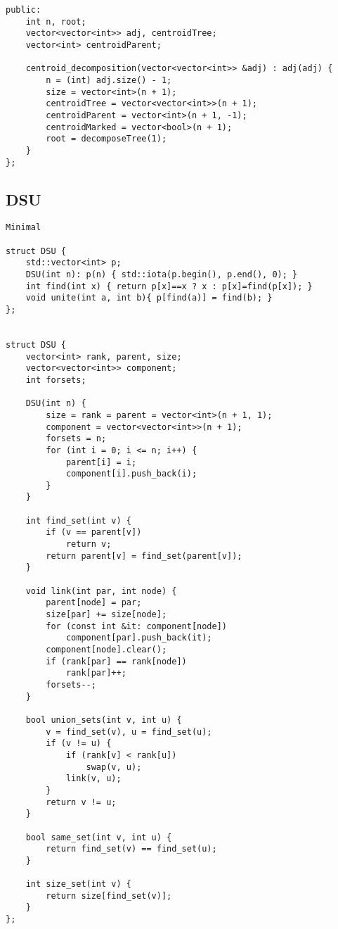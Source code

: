 \documentclass{article}
\begin{document}
\begin{verbatim}
public:  
    int n, root;  
    vector<vector<int>> adj, centroidTree;  
    vector<int> centroidParent;  
  
    centroid_decomposition(vector<vector<int>> &adj) : adj(adj) {  
        n = (int) adj.size() - 1;  
        size = vector<int>(n + 1);  
        centroidTree = vector<vector<int>>(n + 1);  
        centroidParent = vector<int>(n + 1, -1);  
        centroidMarked = vector<bool>(n + 1);  
        root = decomposeTree(1);  
    }  
};
\end{verbatim}

\subsection{DSU}
\begin{verbatim}
Minimal

struct DSU {  
    std::vector<int> p;  
    DSU(int n): p(n) { std::iota(p.begin(), p.end(), 0); }  
    int find(int x) { return p[x]==x ? x : p[x]=find(p[x]); }  
    void unite(int a, int b){ p[find(a)] = find(b); }  
};


struct DSU {  
    vector<int> rank, parent, size;  
    vector<vector<int>> component;  
    int forsets;  
  
    DSU(int n) {  
        size = rank = parent = vector<int>(n + 1, 1);  
        component = vector<vector<int>>(n + 1);  
        forsets = n;  
        for (int i = 0; i <= n; i++) {  
            parent[i] = i;  
            component[i].push_back(i);  
        }  
    }  
  
    int find_set(int v) {  
        if (v == parent[v])  
            return v;  
        return parent[v] = find_set(parent[v]);  
    }  
  
    void link(int par, int node) {  
        parent[node] = par;  
        size[par] += size[node];  
        for (const int &it: component[node])  
            component[par].push_back(it);  
        component[node].clear();  
        if (rank[par] == rank[node])  
            rank[par]++;  
        forsets--;  
    }  
  
    bool union_sets(int v, int u) {  
        v = find_set(v), u = find_set(u);  
        if (v != u) {  
            if (rank[v] < rank[u])  
                swap(v, u);  
            link(v, u);  
        }  
        return v != u;  
    }  
  
    bool same_set(int v, int u) {  
        return find_set(v) == find_set(u);  
    }  
  
    int size_set(int v) {  
        return size[find_set(v)];  
    }  
};
\end{verbatim}
\end{document}

